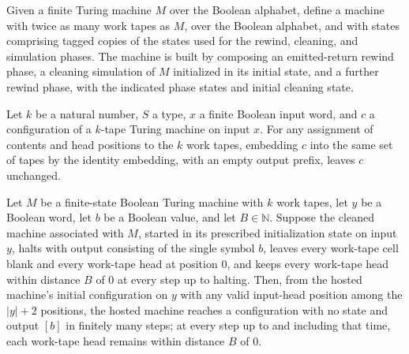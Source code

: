 \begin{definition}
\label{Complexity.b2b_hostedSource}
\leanok
{}
Given a finite Turing machine $M$ over the Boolean alphabet, define a machine with twice
as many work tapes as $M$, over the Boolean alphabet, and with states comprising tagged
copies of the states used for the rewind, cleaning, and simulation phases. The machine
is built by composing an emitted-return rewind phase, a cleaning simulation of $M$
initialized in its initial state, and a further rewind phase, with the indicated phase
states and initial cleaning state.
\end{definition}

\begin{theorem}
\label{Complexity.b2b_embed_refl}
\leanok
{}
Let $k$ be a natural number, $S$ a type, $x$ a finite Boolean input word, and $c$ a
configuration of a $k$-tape Turing machine on input $x$. For any assignment of contents
and head positions to the $k$ work tapes, embedding $c$ into the same set of tapes by
the identity embedding, with an empty output prefix, leaves $c$ unchanged.
\end{theorem}

\begin{theorem}
\label{Complexity.b2b_hostedSource_run}
\leanok
{}
Let $M$ be a finite-state Boolean Turing machine with $k$ work tapes, let $y$ be a
Boolean word, let $b$ be a Boolean value, and let $B\in\mathbb{N}$. Suppose the cleaned
machine associated with $M$, started in its prescribed initialization state on input
$y$, halts with output consisting of the single symbol $b$, leaves every work-tape cell
blank and every work-tape head at position $0$, and keeps every work-tape head within
distance $B$ of $0$ at every step up to halting. Then, from the hosted machine's initial
configuration on $y$ with any valid input-head position among the $|y|+2$ positions, the
hosted machine reaches a configuration with no state and output $[b]$ in finitely many
steps; at every step up to and including that time, each work-tape head remains within
distance $B$ of $0$.
\end{theorem}

